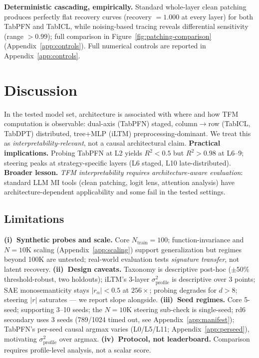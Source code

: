 \documentclass{article}
\begin{document}
\textbf{Deterministic cascading, empirically.} Standard whole-layer clean patching produces perfectly flat recovery curves (recovery $= 1.000$ at every layer) for both TabPFN and TabICL, while noising-based tracing reveals differential sensitivity (range $> 0.99$); full comparison in Figure~\ref{fig:patching-comparison} (Appendix~\ref{app:controls}). Full numerical controls are reported in Appendix~\ref{app:controls}.

\section{Discussion}

In the tested model set, architecture is associated with where and how TFM computation is observable: dual-axis (TabPFN) staged, column$\to$row (TabICL, TabDPT) distributed, tree+MLP (iLTM) preprocessing-dominant. We treat this as \emph{interpretability-relevant}, not a causal architectural claim. \textbf{Practical implications.} Probing TabPFN at L2 yields $R^2{<}0.5$ but $R^2{>}0.98$ at L6--9; steering peaks at strategy-specific layers (L6 staged, L10 late-distributed). \textbf{Broader lesson.} \textit{TFM interpretability requires architecture-aware evaluation}: standard LLM MI tools (clean patching, logit lens, attention analysis) have architecture-dependent applicability and some fail in the tested settings.

\subsection{Limitations}

\textbf{(i)~Synthetic probes and scale.} Core $N_\text{train}{=}100$; function-invariance and $N{=}10$K scaling (Appendix~\ref{app:scaling}) support generalization but regimes beyond 100K are untested; real-world evaluation tests \emph{signature transfer}, not latent recovery. \textbf{(ii)~Design caveats.} Taxonomy is descriptive post-hoc ($\pm 50$\% threshold-robust, two holdouts); iLTM's 3-layer $\sigma^2_\text{profile}$ is descriptive over 3 points; SAE monosemanticity stays $|r_\alpha|{<}0.5$ at $256\times$; probing degrades for $d{>}8$; steering $|r|$ saturates --- we report slope alongside. \textbf{(iii)~Seed regimes.} Core 5-seed; supporting 3--10 seeds; the $N{=}10$K steering sub-check is single-seed; rd6 secondary uses 3 seeds (789/1024 timed out, see Appendix~\ref{app:manifest}); TabPFN's per-seed causal argmax varies (L0/L5/L11; Appendix~\ref{app:perseed}), motivating $\sigma^2_\text{profile}$ over argmax. \textbf{(iv)~Protocol, not leaderboard.} Comparison requires profile-level analysis, not a scalar score.
\end{document}
